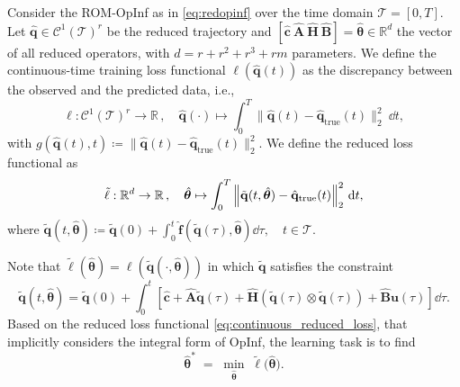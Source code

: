 \begin{definition} 
    \label{def:continuous_loss}
    Consider the ROM-OpInf as in \eqref{eq:redopinf} over the time domain $\mathcal{T}=[0,T]$. Let $\hat{\mathbf{q}}\in\mathcal{C}^1(\mathcal{T})^r$ be the reduced trajectory and $[\hat{\mathbf{c}}~\hat{\mathbf{A}}~\hat{\mathbf{H}}~\hat{\mathbf{B}}]=\hat{\bm{\theta}}\in\mathbb{R}^d$ the vector of all reduced operators, with $d=r+r^2+r^3+rm$ parameters. We define the continuous-time training loss functional $\ell(\hat{\mathbf{q}}(t))$ as the discrepancy between the observed and the predicted data, i.e.,\\
    \begin{equation}
        \ell: \mathcal{C}^1(\mathcal{T})^r  \to \mathbb{R}\,,\quad \hat{\mathbf{q}}(\cdot) \mapsto \int_0^T \Big\|\hat{\mathbf{q}}(t) - \hat{\mathbf{q}}_\mathrm{true}(t)\Big\|_2^2~\dd t,
        \label{eq:continuous_loss}
    \end{equation}
    with $g(\hat{\mathbf{q}}(t),t) \coloneqq \Big\|\hat{\mathbf{q}}(t) - \hat{\mathbf{q}}_\mathrm{true}(t)\Big\|_2^2$. We define the reduced loss functional as\\ 
    \begin{equation}
        \tilde{\ell}: \mathbb{R}^d  \to \mathbb{R}\,,\quad \hat{\bm{\theta}} \mapsto \int_0^T \norm{\tilde{\mathbf{q}}(t,\hat{\bm{\theta}}) - \hat{\mathbf{q}}_\mathrm{true}(t)}_2^2~\dd t,
        \label{eq:continuous_reduced_loss}
    \end{equation}
    where $\tilde{\mathbf{q}}(t, \hat{\bm{\theta}}) \coloneqq \tilde{\mathbf{q}}(0) + \displaystyle\int_{0}^t \hat{\mathbf{f}}(\tilde{\mathbf{q}}(\tau),\hat{\bm{\theta}})\dd \tau, \quad t\in\mathcal{T}$.

\end{definition}
Note that $\tilde{\ell}(\hat{\bm{\theta}}) = \ell(\tilde{\mathbf{q}}(\cdot,\hat{\bm{\theta}}))$ in which $\tilde{\mathbf{q}}$ satisfies the constraint\\ 
$$\tilde{\mathbf{q}}(t, \hat{\bm{\theta}}) = \tilde{\mathbf{q}}(0) + \displaystyle\int_{0}^t\left[ \hat{\mathbf{c}} + \hat{\mathbf{A}}\tilde{\mathbf{q}}(\tau) + \hat{\mathbf{H}}\left(\tilde{\mathbf{q}}(\tau)\otimes\tilde{\mathbf{q}}(\tau) \right) +\hat{\mathbf{B}}\mathbf{u}(\tau) \right]\dd \tau.$$
Based on the reduced loss functional \eqref{eq:continuous_reduced_loss}, that implicitly considers the integral form of OpInf, the learning task is to find\\
\begin{equation}
  \hat{\bm{\theta}}^*
  \;=\;
  \min_{\hat{\bm{\theta}}}\;
  \tilde{\ell}\bigl(\hat{\bm{\theta}}\bigr).
\end{equation}
